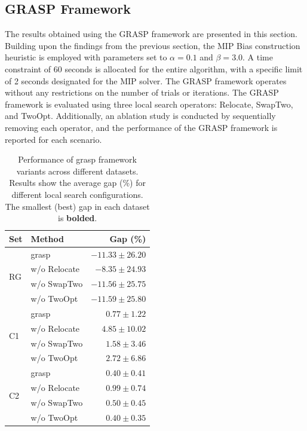 \documentclass[twocolumn]{article} %
\begin{document}
\subsection{GRASP Framework}

The results obtained using the GRASP framework are presented in this section. Building upon the findings from the previous section, the MIP Bias construction heuristic is employed with parameters set to $\alpha = 0.1$ and $\beta = 3.0$. A time constraint of 60 seconds is allocated for the entire algorithm, with a specific limit of 2 seconds designated for the MIP solver. The GRASP framework operates without any restrictions on the number of trials or iterations.
The GRASP framework is evaluated using three local search operators: Relocate, SwapTwo, and TwoOpt. Additionally, an ablation study is conducted by sequentially removing each operator, and the performance of the GRASP framework is reported for each scenario.


\begin{table}[h]
    \caption{Performance of \gls{grasp} framework variants across different datasets. Results show the average gap (\%) for different local search configurations. The smallest (best) gap in each dataset is \textbf{bolded}.}
    \label{tab:grasp_performance}
    \centering
    \begin{tabular}{llr}
        \toprule
        \textbf{Set} & \textbf{Method} & \textbf{Gap (\%)} \\
        \midrule
        \multirow[c]{4}{*}{RG} 
            & \gls{grasp} & $-11.33 \pm 26.20$ \\
            & w/o Relocate & $-8.35 \pm 24.93$ \\
            & w/o SwapTwo & $-11.56 \pm 25.75$ \\
            & w/o TwoOpt & $\mathbf{-11.59 \pm 25.80}$ \\
        \midrule
        \multirow[c]{4}{*}{C1} 
            & \gls{grasp} & $\mathbf{0.77 \pm 1.22}$ \\
            & w/o Relocate & $4.85 \pm 10.02$ \\
            & w/o SwapTwo & $1.58 \pm 3.46$ \\
            & w/o TwoOpt & $2.72 \pm 6.86$ \\
        \midrule
        \multirow[c]{4}{*}{C2} 
            & \gls{grasp} & $\mathbf{0.40 \pm 0.41}$ \\
            & w/o Relocate & $0.99 \pm 0.74$ \\
            & w/o SwapTwo & $0.50 \pm 0.45$ \\
            & w/o TwoOpt & $\mathbf{0.40 \pm 0.35}$ \\
        \bottomrule
    \end{tabular}
\end{table}
\end{document}
